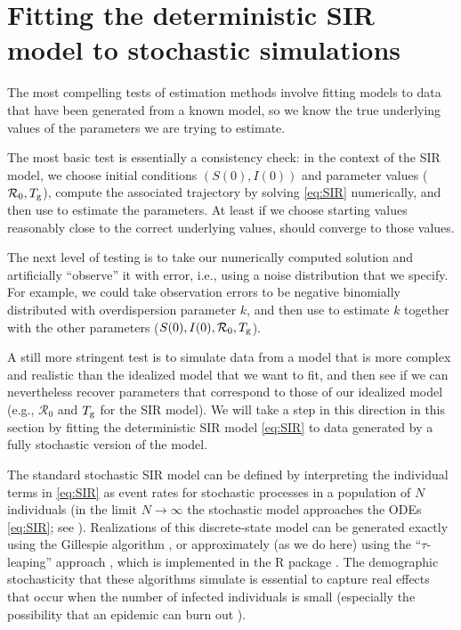 \documentclass[]{interact}\usepackage[]{graphicx}\usepackage[]{xcolor}
\theoremstyle{plain}%
\theoremstyle{definition}
\theoremstyle{remark}
\newcommand{\R}{{\mathcal R}}
\newcommand{\Rn}{\R_0}
\newcommand{\Tg}{T_{\rm g}}
\newcommand{\code}[1]{\texttt{\detokenize{#1}}}
\newcommand{\Sinit}{S(0)}
\newcommand{\Iinit}{I(0)}
\begin{document}
\section{Fitting the deterministic SIR model to stochastic simulations}\label{sec:stoch}



The most compelling tests of estimation methods involve fitting models
to data that have been generated from a known model, so we know
the true underlying values of the parameters we are trying to estimate.

The most basic test is essentially a consistency check: in the context
of the SIR model, we choose initial conditions $(\Sinit,\Iinit)$ and
parameter values ($\Rn,\Tg$), compute the associated trajectory by
solving \cref{eq:SIR} numerically, and then use \code{fitode} to
estimate the parameters.  At least if we choose starting values
reasonably close to the correct underlying values, \code{fitode} should converge
to those values.

The next level of testing is to take our numerically computed
solution and artificially ``observe'' it with error, i.e., using a
noise distribution that we specify.  For example, we could take
observation errors to be negative binomially distributed with
overdispersion parameter $k$, and then use \code{fitode} to estimate
$k$ together with the other parameters ($\Sinit,\Iinit,\Rn,\Tg$).

A still more stringent test is to simulate data from a model
that is more complex and realistic than the idealized model that we
want to fit, and then see if we can nevertheless recover parameters
that correspond to those of our idealized
model (e.g., $\Rn$ and $\Tg$ for the SIR model).  We will take a step
in this direction in this section by fitting the deterministic SIR
model \eqref{eq:SIR} to data generated by a fully stochastic version
of the model.

The standard stochastic SIR model \citep{AndeBrit00b} can be defined by
interpreting the individual terms in \cref{eq:SIR} as event rates for
stochastic processes in a population of $N$ individuals (in the limit
$N\to\infty$ the stochastic model approaches the ODEs \eqref{eq:SIR};
see \citet{EthiKurt86}).  Realizations of this discrete-state model can
be generated exactly using the Gillespie algorithm \citep{Gill76}, or
approximately (as we do here) using the ``$\tau$-leaping'' approach
\citep{Gill01}, which is implemented in the \code{adaptivetau} R
package \citep{adaptivetau}.  The demographic stochasticity that these
algorithms simulate is essential to capture real effects that occur
when the number of infected individuals is small (especially the
possibility that an epidemic can burn out \citep{Pars+24}).
\end{document}
